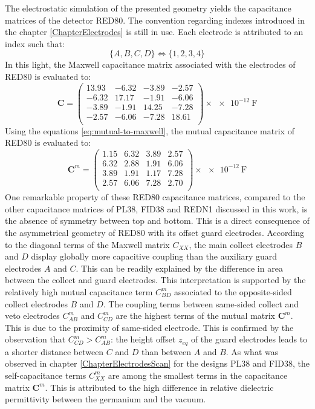The electrostatic simulation of the presented geometry yields the capacitance matrices  of the detector RED80. The convention regarding indexes introduced in the chapter \ref{ChapterElectrodes} is still in use. Each electrode is attributed to an index such that:
\begin{equation}
\label{eq:indexes-convention}
\{ A, B, C, D \} \Leftrightarrow \{ 1, 2, 3, 4 \}
\end{equation}
In this light, the Maxwell capacitance matrix associated with the electrodes of RED80 is evaluated to:
\begin{equation}
\label{eq:red80-maxwell}
\bm{C} = 
\begin{pmatrix}
  13.93 & -6.32 & -3.89 & -2.57\\
  -6.32 & 17.17 & -1.91 & -6.06\\
  -3.89 & -1.91 & 14.25 & -7.28\\
  -2.57 & -6.06 & -7.28 & 18.61\\
\end{pmatrix}
\times \SI{e-12}{\farad}
\end{equation}
Using the equations \ref{eq:mutual-to-maxwell}, the mutual capacitance matrix of RED80 is evaluated to:
\begin{equation}
\label{eq:red80-mutual}
\bm{C}^m = 
\begin{pmatrix}
  1.15 & 6.32 & 3.89 & 2.57\\
  6.32 & 2.88 & 1.91 & 6.06\\
  3.89 & 1.91 & 1.17 & 7.28\\
  2.57 & 6.06 & 7.28 & 2.70\\
\end{pmatrix}
\times \SI{e-12}{\farad}
\end{equation}
One remarkable property of these RED80 capacitance matrices, compared to the other capacitance matrices of PL38, FID38 and REDN1 discussed in this work, is the absence of symmetry between top and bottom. This is a direct consequence of the asymmetrical geometry of RED80 with its offset guard electrodes.  
According to the diagonal terms of the Maxwell matrix $C_{XX}$, the main collect electrodes $B$ and $D$ display globally more capacitive coupling than the auxiliary guard electrodes $A$ and $C$. This can be readily explained by the difference in area between the collect and guard electrodes. This interpretation is supported by the relatively high mutual capacitance term $C_{BD}^m$ associated to the opposite-sided collect electrodes $B$ and $D$. 
The coupling terms between same-sided collect and veto electrodes $C_{AB}^m$ and  $C_{CD}^m$ are the highest terms of the mutual matrix $\bm{C}^m$. This is due to the proximity of same-sided electrode. This is confirmed by the observation that $C_{CD}^m > C_{AB}^m$: the height offset $z_{eq}$ of the guard electrodes leads to a shorter 
distance between $C$ and $D$ than between $A$ and $B$.
As what was observed in chapter \ref{ChapterElectrodesScan} for the designs PL38 and FID38, the self-capacitance terms $C_{XX}^m$ are among the smallest terms in the capacitance matrix $\bm{C}^m$. This is attributed to the high difference in relative dielectric permittivity between the germanium and the vacuum.

